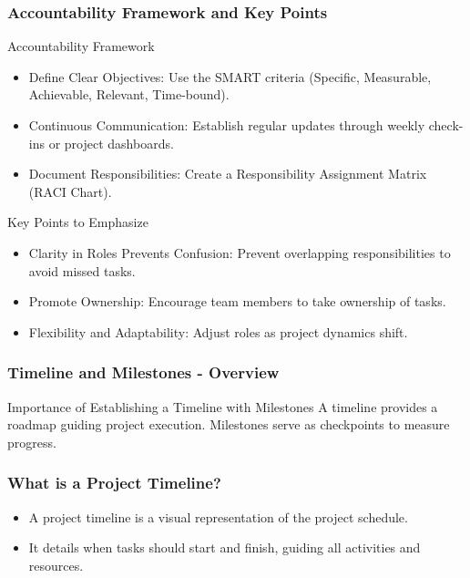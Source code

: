 \documentclass{beamer}
\begin{document}
\begin{frame}[fragile]
    \frametitle{Accountability Framework and Key Points}
    \begin{block}{Accountability Framework}
        \begin{itemize}
            \item Define Clear Objectives: Use the SMART criteria (Specific, Measurable, Achievable, Relevant, Time-bound).
            \item Continuous Communication: Establish regular updates through weekly check-ins or project dashboards.
            \item Document Responsibilities: Create a Responsibility Assignment Matrix (RACI Chart).
        \end{itemize}
    \end{block}
    
    \begin{block}{Key Points to Emphasize}
        \begin{itemize}
            \item Clarity in Roles Prevents Confusion: Prevent overlapping responsibilities to avoid missed tasks.
            \item Promote Ownership: Encourage team members to take ownership of tasks.
            \item Flexibility and Adaptability: Adjust roles as project dynamics shift.
        \end{itemize}
    \end{block}
\end{frame}

\begin{frame}[fragile]
    \frametitle{Timeline and Milestones - Overview}
    \begin{block}{Importance of Establishing a Timeline with Milestones}
        A timeline provides a roadmap guiding project execution. Milestones serve as checkpoints to measure progress.
    \end{block}
\end{frame}

\begin{frame}[fragile]
    \frametitle{What is a Project Timeline?}
    \begin{itemize}
        \item A project timeline is a visual representation of the project schedule.
        \item It details when tasks should start and finish, guiding all activities and resources.
    \end{itemize}
\end{frame}
\end{document}
